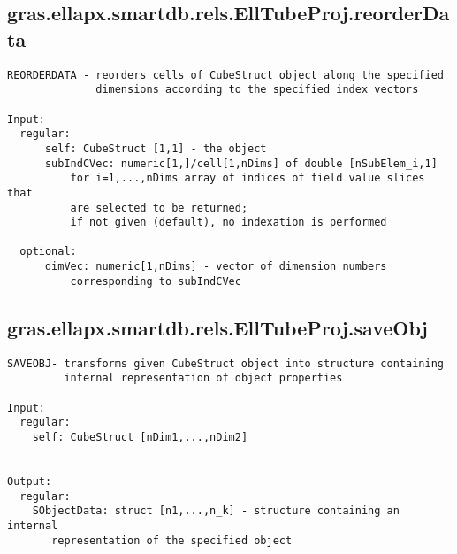 \subsection{\texorpdfstring{gras.ellapx.smartdb.rels.EllTubeProj.reorderData}{reorderData}}\label{method:gras.ellapx.smartdb.rels.EllTubeProj.reorderData}
\begin{verbatim}
REORDERDATA - reorders cells of CubeStruct object along the specified
              dimensions according to the specified index vectors

Input:
  regular:
      self: CubeStruct [1,1] - the object
      subIndCVec: numeric[1,]/cell[1,nDims] of double [nSubElem_i,1]
          for i=1,...,nDims array of indices of field value slices that
          are selected to be returned;
          if not given (default), no indexation is performed

  optional:
      dimVec: numeric[1,nDims] - vector of dimension numbers
          corresponding to subIndCVec
\end{verbatim}
\subsection{\texorpdfstring{gras.ellapx.smartdb.rels.EllTubeProj.saveObj}{saveObj}}\label{method:gras.ellapx.smartdb.rels.EllTubeProj.saveObj}
\begin{verbatim}
SAVEOBJ- transforms given CubeStruct object into structure containing
         internal representation of object properties

Input:
  regular:
    self: CubeStruct [nDim1,...,nDim2]


Output:
  regular:
    SObjectData: struct [n1,...,n_k] - structure containing an internal
       representation of the specified object
\end{verbatim}
